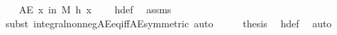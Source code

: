 \begin{isabellebody}
\ \ \isamarkupfalse%
\ {\isachardoublequoteopen}AE\ x\ in\ M{\isachardot}{\kern0pt}\ h\ x\ {\isacharequal}{\kern0pt}\ {}{\isachardoublequoteclose}\ \isamarkupfalse%
\ h{\isacharunderscore}{\kern0pt}def\ \isamarkupfalse%
\ assms\ \isamarkupfalse%
\ {\isacharparenleft}{\kern0pt}subst\ integral{\isacharunderscore}{\kern0pt}nonneg{\isacharunderscore}{\kern0pt}AE{\isacharunderscore}{\kern0pt}eq{\isacharunderscore}{\kern0pt}{}{\isacharunderscore}{\kern0pt}iff{\isacharunderscore}{\kern0pt}AE{\isacharbrackleft}{\kern0pt}symmetric{\isacharbrackright}{\kern0pt}{\isacharparenright}{\kern0pt}\ auto\isanewline
\ \ \isamarkupfalse%
\ \isamarkupfalse%
\ {\isacharquery}{\kern0pt}thesis\ \isamarkupfalse%
\ h{\isacharunderscore}{\kern0pt}def\ \isamarkupfalse%
\ auto\isanewline
{}\isamarkupfalse%
%
\endisatagproof
{\isafoldproof}%
%
\isadelimproof
\isanewline
%
\endisadelimproof
\isanewline
{}\isamarkupfalse%
\isanewline
%
\isadelimtheory
\isanewline
%
\endisadelimtheory
%
\isatagtheory
{}\isamarkupfalse%
%
\endisatagtheory
{\isafoldtheory}%
%
\isadelimtheory
%
\endisadelimtheory
%
\end{isabellebody}%
\endinput
